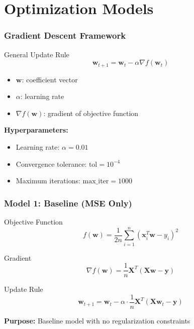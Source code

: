 \documentclass[11pt,aspectratio=169]{beamer}
\begin{document}
\section{Optimization Models}

\begin{frame}
    \frametitle{Gradient Descent Framework}
    \begin{block}{General Update Rule}
        $$\mathbf{w}_{t+1} = \mathbf{w}_t - \alpha \nabla f(\mathbf{w}_t)$$
    \end{block}
    \begin{itemize}
        \item $\mathbf{w}$: coefficient vector
        \item $\alpha$: learning rate
        \item $\nabla f(\mathbf{w})$: gradient of objective function
    \end{itemize}
    \vspace{0.5cm}
    \textbf{Hyperparameters:}
    \begin{itemize}
        \item Learning rate: $\alpha = 0.01$
        \item Convergence tolerance: $\text{tol} = 10^{-4}$
        \item Maximum iterations: $\text{max\_iter} = 1000$
    \end{itemize}
\end{frame}

\begin{frame}[fragile]
    \frametitle{Model 1: Baseline (MSE Only)}
    \begin{block}{Objective Function}
        $$f(\mathbf{w}) = \frac{1}{2n}\sum_{i=1}^{n} (\mathbf{x}_i^T\mathbf{w} - y_i)^2$$
    \end{block}
    \begin{block}{Gradient}
        $$\nabla f(\mathbf{w}) = \frac{1}{n}\mathbf{X}^T(\mathbf{X}\mathbf{w} - \mathbf{y})$$
    \end{block}
    \begin{block}{Update Rule}
        $$\mathbf{w}_{t+1} = \mathbf{w}_t - \alpha \cdot \frac{1}{n}\mathbf{X}^T(\mathbf{X}\mathbf{w}_t - \mathbf{y})$$
    \end{block}
    \textbf{Purpose:} Baseline model with no regularization constraints
\end{frame}
\end{document}
